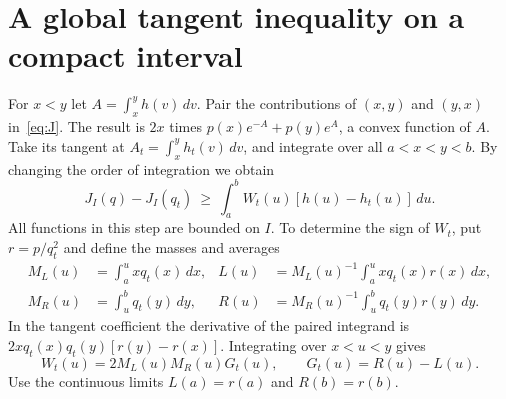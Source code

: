 \documentclass[11pt]{article}
\begin{document}
\section{A global tangent inequality on a compact interval}
For $x<y$ let $A=\int_x^y h(v)\,dv$. Pair the contributions of $(x,y)$
and $(y,x)$ in~\eqref{eq:J}. The result is $2x$ times
$p(x)e^{-A}+p(y)e^A$, a convex function of $A$.
Take its tangent at $A_t=\int_x^y h_t(v)\,dv$, and integrate over all
$a<x<y<b$. By changing the order of integration we obtain
\begin{equation}\label{eq:tangent}
 J_I(q)-J_I(q_t)\ \ge\
 \int_a^b W_t(u)[h(u)-h_t(u)]\,du .
\end{equation}
All functions in this step are bounded on $I$. To determine the sign of
$W_t$, put $r=p/q_t^2$ and define the masses and averages
\begin{align*}
 M_L(u)&=\int_a^u xq_t(x)\,dx,&
 L(u)&=M_L(u)^{-1}\int_a^u xq_t(x)r(x)\,dx,\\
 M_R(u)&=\int_u^b q_t(y)\,dy,&
 R(u)&=M_R(u)^{-1}\int_u^b q_t(y)r(y)\,dy .
\end{align*}
In the tangent coefficient the derivative of the paired integrand is
$2xq_t(x)q_t(y)[r(y)-r(x)]$. Integrating over $x<u<y$ gives
\begin{equation}\label{eq:weight}
 W_t(u)=2M_L(u)M_R(u)G_t(u),\qquad G_t(u)=R(u)-L(u).
\end{equation}
Use the continuous limits $L(a)=r(a)$ and $R(b)=r(b)$.
\end{document}
